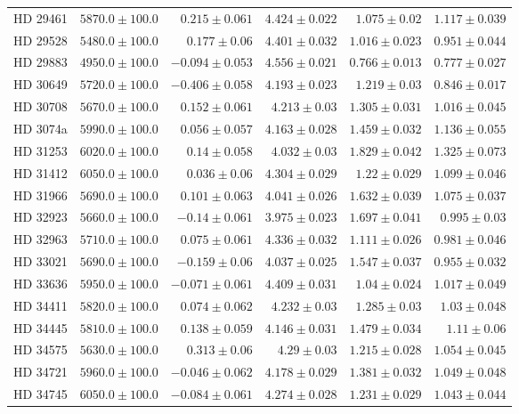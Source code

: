 \begin{longtable*}{lrrrrr}
HD 29461 & $5870.0\pm 100.0$ & $0.215\pm 0.061$ & $4.424\pm 0.022$ & $1.075\pm 0.02$ & $1.117\pm 0.039$ \\ 
HD 29528 & $5480.0\pm 100.0$ & $0.177\pm 0.06$ & $4.401\pm 0.032$ & $1.016\pm 0.023$ & $0.951\pm 0.044$ \\ 
HD 29883 & $4950.0\pm 100.0$ & $-0.094\pm 0.053$ & $4.556\pm 0.021$ & $0.766\pm 0.013$ & $0.777\pm 0.027$ \\ 
HD 30649 & $5720.0\pm 100.0$ & $-0.406\pm 0.058$ & $4.193\pm 0.023$ & $1.219\pm 0.03$ & $0.846\pm 0.017$ \\ 
HD 30708 & $5670.0\pm 100.0$ & $0.152\pm 0.061$ & $4.213\pm 0.03$ & $1.305\pm 0.031$ & $1.016\pm 0.045$ \\ 
HD 3074a & $5990.0\pm 100.0$ & $0.056\pm 0.057$ & $4.163\pm 0.028$ & $1.459\pm 0.032$ & $1.136\pm 0.055$ \\ 
HD 31253 & $6020.0\pm 100.0$ & $0.14\pm 0.058$ & $4.032\pm 0.03$ & $1.829\pm 0.042$ & $1.325\pm 0.073$ \\ 
HD 31412 & $6050.0\pm 100.0$ & $0.036\pm 0.06$ & $4.304\pm 0.029$ & $1.22\pm 0.029$ & $1.099\pm 0.046$ \\ 
HD 31966 & $5690.0\pm 100.0$ & $0.101\pm 0.063$ & $4.041\pm 0.026$ & $1.632\pm 0.039$ & $1.075\pm 0.037$ \\ 
HD 32923 & $5660.0\pm 100.0$ & $-0.14\pm 0.061$ & $3.975\pm 0.023$ & $1.697\pm 0.041$ & $0.995\pm 0.03$ \\ 
HD 32963 & $5710.0\pm 100.0$ & $0.075\pm 0.061$ & $4.336\pm 0.032$ & $1.111\pm 0.026$ & $0.981\pm 0.046$ \\ 
HD 33021 & $5690.0\pm 100.0$ & $-0.159\pm 0.06$ & $4.037\pm 0.025$ & $1.547\pm 0.037$ & $0.955\pm 0.032$ \\ 
HD 33636 & $5950.0\pm 100.0$ & $-0.071\pm 0.061$ & $4.409\pm 0.031$ & $1.04\pm 0.024$ & $1.017\pm 0.049$ \\ 
HD 34411 & $5820.0\pm 100.0$ & $0.074\pm 0.062$ & $4.232\pm 0.03$ & $1.285\pm 0.03$ & $1.03\pm 0.048$ \\ 
HD 34445 & $5810.0\pm 100.0$ & $0.138\pm 0.059$ & $4.146\pm 0.031$ & $1.479\pm 0.034$ & $1.11\pm 0.06$ \\ 
HD 34575 & $5630.0\pm 100.0$ & $0.313\pm 0.06$ & $4.29\pm 0.03$ & $1.215\pm 0.028$ & $1.054\pm 0.045$ \\ 
HD 34721 & $5960.0\pm 100.0$ & $-0.046\pm 0.062$ & $4.178\pm 0.029$ & $1.381\pm 0.032$ & $1.049\pm 0.048$ \\ 
HD 34745 & $6050.0\pm 100.0$ & $-0.084\pm 0.061$ & $4.274\pm 0.028$ & $1.231\pm 0.029$ & $1.043\pm 0.044$ \\ 

\end{longtable*}
